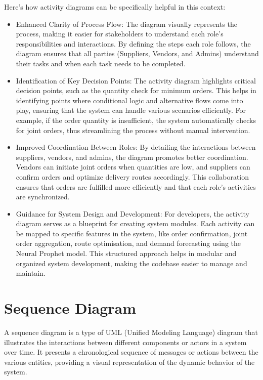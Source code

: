 Here’s how activity diagrams can be specifically helpful in this context:
\begin{itemize}
    \item Enhanced Clarity of Process Flow: The diagram visually represents the process, making it easier for stakeholders to understand each role's responsibilities and interactions. By defining the steps each role follows, the diagram ensures that all parties (Suppliers, Vendors, and Admins) understand their tasks and when each task needs to be completed.
    \item Identification of Key Decision Points: The activity diagram highlights critical decision points, such as the quantity check for minimum orders. This helps in identifying points where conditional logic and alternative flows come into play, ensuring that the system can handle various scenarios efficiently. For example, if the order quantity is insufficient, the system automatically checks for joint orders, thus streamlining the process without manual intervention.
    \item Improved Coordination Between Roles: By detailing the interactions between suppliers, vendors, and admins, the diagram promotes better coordination. Vendors can initiate joint orders when quantities are low, and suppliers can confirm orders and optimize delivery routes accordingly. This collaboration ensures that orders are fulfilled more efficiently and that each role's activities are synchronized.
    \item Guidance for System Design and Development: For developers, the activity diagram serves as a blueprint for creating system modules. Each activity can be mapped to specific features in the system, like order confirmation, joint order aggregation, route optimisation, and demand forecasting using the Neural Prophet model. This structured approach helps in modular and organized system development, making the codebase easier to manage and maintain.
\end{itemize}
\section{Sequence Diagram}

A sequence diagram is a type of UML (Unified Modeling Language) diagram that illustrates the interactions between different components or actors in a system over time. It presents a chronological sequence of messages or actions between the various entities, providing a visual representation of the dynamic behavior of the system.
